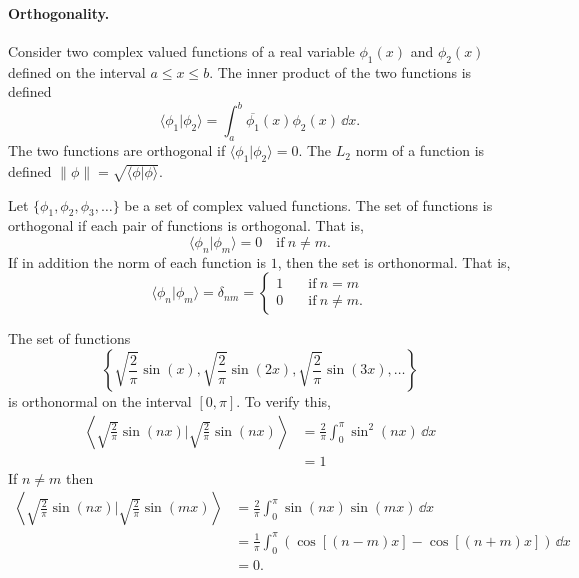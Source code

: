 \paragraph{Orthogonality.}
Consider two complex valued functions of a real variable
$\phi_1(x)$ and $\phi_2(x)$ defined
on the interval $a \leq x \leq b$.  The inner product of the two functions
is defined
\[ \langle \phi_1 | \phi_2 \rangle = \int_a^b \overline{\phi_1}(x) \phi_2(x)\,\dd x.\]
The two functions are orthogonal if $\langle \phi_1 | \phi_2 \rangle = 0$.  The $L_2$
norm of a function is defined $\| \phi \| = \sqrt{\langle \phi | \phi \rangle}$.

Let $\{ \phi_1, \phi_2, \phi_3, \ldots\}$ be a set of complex valued
functions.  The set of functions is orthogonal if each pair of functions
is orthogonal.  That is,
\[ \langle \phi_n | \phi_m \rangle = 0 \quad \mathrm{if}\ n \neq m.\]
If in addition the norm of each function is $1$, then the set is orthonormal.
That is,
\[ \langle \phi_n | \phi_m \rangle = \delta_{nm} = 
\begin{cases}
  1 \quad &\mathrm{if}\ n = m \\
  0 \quad &\mathrm{if}\ n \neq m.
\end{cases}
\]


\begin{Example}
  The set of functions
  \[ \left\{ \sqrt{\frac{2}{\pi}} \sin(x), \sqrt{\frac{2}{\pi}} \sin(2 x),
    \sqrt{\frac{2}{\pi}} \sin(3 x), \ldots \right\} \]
  is orthonormal on the interval $[0, \pi]$.
  To verify this,
  \begin{align*}
    \left\langle \sqrt{\frac{2}{\pi}} \sin(n x) \Bigg| 
      \sqrt{\frac{2}{\pi}} \sin(n x) \right\rangle
    &= \frac{2}{\pi} \int_0^\pi \sin^2(n x)\,\dd x \\
    &= 1
  \end{align*}
  If $n \neq m$ then
  \begin{align*}
    \left\langle \sqrt{\frac{2}{\pi}} \sin(n x) \Bigg| 
      \sqrt{\frac{2}{\pi}} \sin(m x) \right\rangle
    &= \frac{2}{\pi} \int_0^\pi \sin(n x) \sin(m x)\,\dd x \\
    &= \frac{1}{\pi} \int_0^\pi (\cos[(n-m)x] - \cos[(n+m)x])\,\dd x \\
    &= 0.
  \end{align*}
\end{Example}








